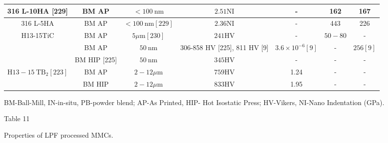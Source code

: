 \documentclass[10pt]{article}
\begin{document}
\begin{center}
\begin{tabular}{|c|c|c|c|c|c|c|}
\hline
316 L-10HA [229] & BM AP & $<100 \mathrm{~nm}$ & $2.51 \mathrm{NI}$ & - & 162 & 167 \\
\hline
316 L-5HA & BM AP & $<100 \mathrm{~nm}[229]$ & $2.36 \mathrm{NI}$ & - & 443 & 226 \\
\hline
\multirow[t]{3}{*}{H13-15TiC} & BM AP & $5 \mu \mathrm{m}[230]$ & $241 \mathrm{HV}$ & - & $50-80$ & - \\
\hline
 & BM AP & $50 \mathrm{~nm}$ & 306-858 HV [225], 811 HV [9] & $3.6 \times 10^{-6}[9]$ & - & $256[9]$ \\
\hline
 & BM HIP [225] & $50 \mathrm{~nm}$ & $345 \mathrm{HV}$ & - & - & - \\
\hline
\multirow{2}{*}{$\mathrm{H} 13-15 \mathrm{~TB}_{2}[223]$} & BM AP & $2-12 \mu \mathrm{m}$ & $759 \mathrm{HV}$ & 1.24 & - & - \\
\hline
 & BM HIP & $2-12 \mu \mathrm{m}$ & $833 \mathrm{HV}$ & 1.95 & - & - \\
\hline
\end{tabular}
\end{center}

BM-Ball-Mill, IN-in-situ, PB-powder blend; AP-As Printed, HIP- Hot Isostatic Press; HV-Vikers, NI-Nano Indentation (GPa).

Table 11

Properties of LPF processed MMCs.
\end{document}
